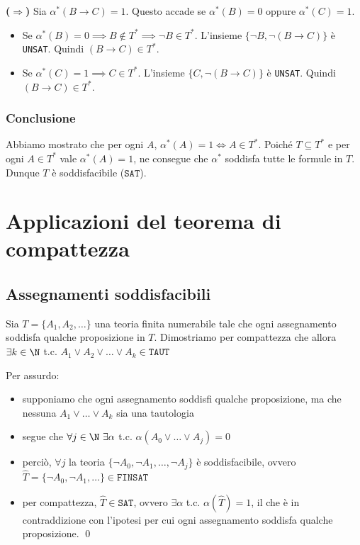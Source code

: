 \documentclass[a4paper,11pt]{report}
\newcommand{\SAT}{\texttt{SAT}}
\newcommand{\FINSAT}{\texttt{FINSAT}}
\newcommand{\UNSAT}{\texttt{UNSAT}}
\newcommand{\TAUT}{\texttt{TAUT}}
\begin{document}
\begin{itemize}
\begin{enumerate}
\subitem \textbf{(\(\Rightarrow\))} Sia \( \alpha^*(B \rightarrow C) = 1 \).
Questo accade se \( \alpha^*(B)=0 \) oppure \( \alpha^*(C)=1 \).

\begin{itemize}
    \item Se \( \alpha^*(B)=0 \implies B \notin T^* \implies \neg B \in T^* \). L'insieme \( \{\neg B, \neg(B \rightarrow C)\} \) è  \UNSAT. Quindi \( (B \rightarrow C) \in T^* \).
    \item Se \( \alpha^*(C)=1 \implies C \in T^* \). L'insieme \( \{C, \neg(B \rightarrow C)\} \) è  \UNSAT. Quindi \( (B \rightarrow C) \in T^* \).
\end{itemize}

        \end{enumerate}
\end{itemize}


\subsubsection*{Conclusione}
Abbiamo mostrato che per ogni \( A \), \( \alpha^*(A)=1 \iff A \in T^* \).
Poiché \( T \subseteq T^* \) e per ogni \( A \in T^* \) vale \( \alpha^*(A)=1 \), ne consegue che \( \alpha^* \) soddisfa tutte le formule in \( T \).
Dunque \( T \) è soddisfacibile (\( \SAT \)).



\section{Applicazioni del teorema di compattezza}

\subsection*{Assegnamenti soddisfacibili}
Sia \( T = \{A_1, A_2, \dots\} \) una teoria finita numerabile tale che ogni assegnamento soddisfa qualche proposizione in \( T \). Dimostriamo per compattezza che allora \( \exists k \in \N \) t.c. \( A_1 \lor A_2 \lor \dots \lor A_k \in \TAUT \)

Per assurdo:
\begin{itemize}
    \item supponiamo che ogni assegnamento soddisfi qualche proposizione, ma che nessuna \( A_1 \lor \dots \lor A_k \) sia una tautologia
    \item segue che \( \forall j \in \N \ \exists \alpha \) t.c. \( \alpha(A_0 \lor \dots \lor A_j) = 0 \)
    \item perciò, \( \forall j \) la teoria \( \{\neg A_0, \neg A_1, \dots, \neg A_j\}\) è soddisfacibile, ovvero \( \hat{T} = \{\neg A_0, \neg A_1, \dots\} \in \FINSAT\)
    \item per compattezza, \( \hat{T}\in \SAT \), ovvero \( \exists \alpha \) t.c. \( \alpha(\hat{T})=1 \), il che è in contraddizione con l'ipotesi per cui ogni assegnamento soddisfa qualche proposizione. \qed
\end{itemize}
\end{document}
